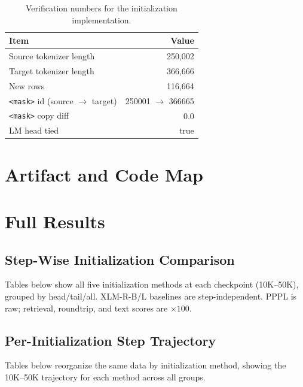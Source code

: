 \begin{table}[h]\centering\small
\caption{Verification numbers for the initialization implementation.}
\label{tab:audit}
\begin{tabular}{@{}lr@{}}
\toprule
Item & Value \\
\midrule
Source tokenizer length & 250,002 \\
Target tokenizer length & 366,666 \\
New rows & 116,664 \\
\verb|<mask>| id (source $\to$ target) & 250001 $\to$ 366665 \\
\verb|<mask>| copy diff & 0.0 \\
LM head tied & true \\
\bottomrule
\end{tabular}
\end{table}

\section{Artifact and Code Map}



\section{Full Results}

\subsection{Step-Wise Initialization Comparison}

Tables below show all five initialization methods at each checkpoint (10K--50K),
grouped by head/tail/all.
XLM-R-B/L baselines are step-independent.
PPPL is raw; retrieval, roundtrip, and text scores are $\times100$.



\clearpage
\subsection{Per-Initialization Step Trajectory}

Tables below reorganize the same data by initialization method,
showing the 10K--50K trajectory for each method across all groups.



